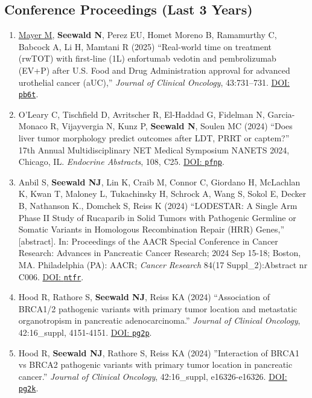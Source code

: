 \documentclass[letterpaper,11pt]{article} %
\begin{document}
 	\subsection*{Conference Proceedings (Last 3 Years)}
 	\begin{enumerate}
        
        \item \underline{Mayer M}, \textbf{Seewald N}, Perez EU, Homet Moreno B, Ramamurthy C, Babcock A, Li H, Mamtani R (2025) ``Real-world time on treatment (rwTOT) with first-line (1L) enfortumab vedotin and pembrolizumab (EV+P) after U.S. Food and Drug Administration approval for advanced urothelial cancer (aUC),'' \textit{Journal of Clinical Oncology}, 43:731–731. \href{https://doi.org/pb6t}{DOI: \texttt{pb6t}}.

        \item O'Leary C, Tischfield D, Avritscher R, El-Haddad G, Fidelman N, Garcia-Monaco R, Vijayvergia N, Kunz P, \textbf{Seewald N}, Soulen MC (2024) ``Does liver tumor morphology predict outcomes after LDT, PRRT or captem?'' 17th Annual Multidisciplinary NET Medical Symposium NANETS 2024, Chicago, IL. \textit{Endocrine Abstracts}, 108, C25. \href{https://doi.org/pfnp}{DOI: \texttt{pfnp}}.
    
 		\item Anbil S, \textbf{Seewald NJ}, Lin K, Craib M, Connor C, Giordano H, McLachlan K, Kwan T, Maloney L, Tukachinsky H, Schrock A, Wang S, Sokol E, Decker B, Nathanson K., Domchek S, Reiss K (2024) ``LODESTAR: A Single Arm Phase II Study of Rucaparib in Solid Tumors with Pathogenic Germline or Somatic Variants in Homologous Recombination Repair (HRR) Genes,'' [abstract]. In: Proceedings of the AACR Special Conference in Cancer Research: Advances in Pancreatic Cancer Research; 2024 Sep 15-18; Boston, MA. Philadelphia (PA): AACR; \textit{Cancer Research} 84(17 Suppl\_2):Abstract nr C006. \href{https://doi.org/ntfr}{DOI: \texttt{ntfr}}.

        \item Hood R, Rathore S, \textbf{Seewald NJ}, Reiss KA (2024) ``Association of BRCA1/2 pathogenic variants with primary tumor location and metastatic organotropism in pancreatic adenocarcinoma.'' \textit{Journal of Clinical Oncology}, 42:16\_suppl, 4151-4151. \href{https://doi.org/pg2p}{DOI: \texttt{pg2p}}.

        \item Hood R, \textbf{Seewald NJ}, Rathore S, Reiss KA (2024) ''Interaction of BRCA1 vs BRCA2 pathogenic variants with primary tumor location in pancreatic cancer.'' \textit{Journal of Clinical Oncology}, 42:16\_suppl, e16326-e16326. \href{https://doi.org/pg2k}{DOI: \texttt{pg2k}}.
        

\end{enumerate}
\end{document}
